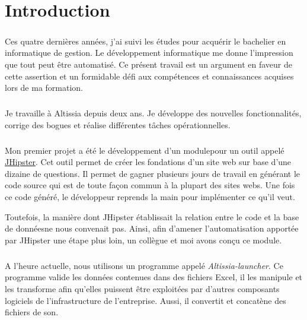 \chapter{Introduction}
\label{ch:introduction}

\paragraph{}
Ces quatre dernières années, j'ai suivi les études pour acquérir le bachelier en informatique de gestion.
Le développement informatique me donne l'impression que tout peut être automatisé.
Ce présent travail est un argument en faveur de cette assertion et un formidable défi aux compétences et connaissances acquises lors de ma formation.

\paragraph{}
Je travaille à Altissia depuis deux ans.
Je développe des nouvelles fonctionnalités, corrige des bogues et réalise différentes tâches opérationnelles.

\paragraph{}
Mon premier projet a été le développement d'un module\fnmark pour un outil appelé \href{https://www.jhipster.tech/}{JHipster}.
Cet outil permet de créer les fondations d'un site web sur base d'une dizaine de questions.
Il permet de gagner plusieurs jours de travail en générant le code source qui est de toute façon commun à la plupart des sites webs.
Une fois ce code généré, le développeur reprends la main pour implémenter ce qu'il veut.

Toutefois, la manière dont JHipster établissait la relation entre le code et la base de données\fnmark ne nous convenait pas.
Ainsi, afin d'amener l'automatisation apportée par JHipster une étape plus loin, un collègue et moi avons conçu ce module.


\paragraph{}
A l'heure actuelle, nous utilisons un programme appelé \textit{Altissia-launcher}.
Ce programme valide les données contenues dans des fichiers Excel, il les manipule et les transforme afin qu'elles puissent être exploitées par d'autres composants logiciels de l'infrastructure de l'entreprise.
Aussi, il convertit et concatène des fichiers de son.

